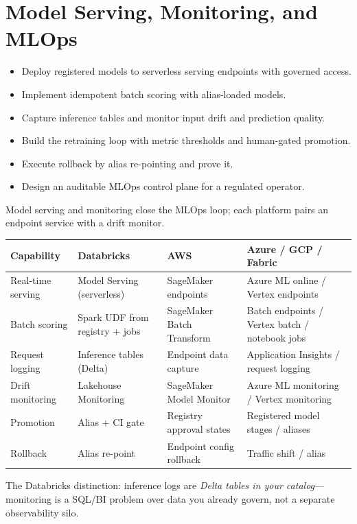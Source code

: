 \chapter{Model Serving, Monitoring, and MLOps}
%
%
\begin{objectives}
\begin{itemize}
    \item Deploy registered models to serverless serving endpoints with governed access.
    \item Implement idempotent batch scoring with alias-loaded models.
    \item Capture inference tables and monitor input drift and prediction quality.
    \item Build the retraining loop with metric thresholds and human-gated promotion.
    \item Execute rollback by alias re-pointing and prove it.
    \item Design an auditable MLOps control plane for a regulated operator.
\end{itemize}
\end{objectives}

\begin{crosscloud}
Model serving and monitoring close the MLOps loop; each platform pairs an endpoint service with a
drift monitor.

\vspace{2mm}
{\footnotesize
\begin{tabular}{@{}p{3.0cm}p{3.4cm}p{3.2cm}p{3.2cm}@{}}
\toprule
\textbf{Capability} & \textbf{Databricks} & \textbf{AWS} & \textbf{Azure / GCP / Fabric} \\
\midrule
Real-time serving & Model Serving (serverless) & SageMaker endpoints & Azure ML online / Vertex endpoints \\
Batch scoring & Spark UDF from registry + jobs & SageMaker Batch Transform & Batch endpoints / Vertex batch / notebook jobs \\
Request logging & Inference tables (Delta) & Endpoint data capture & Application Insights / request logging \\
Drift monitoring & Lakehouse Monitoring & SageMaker Model Monitor & Azure ML monitoring / Vertex monitoring \\
Promotion & Alias + CI gate & Registry approval states & Registered model stages / aliases \\
Rollback & Alias re-point & Endpoint config rollback & Traffic shift / alias \\
\bottomrule
\end{tabular}}

\vspace{1mm}
The Databricks distinction: inference logs are \emph{Delta tables in your catalog}---monitoring
is a SQL/BI problem over data you already govern, not a separate observability silo.
\end{crosscloud}

